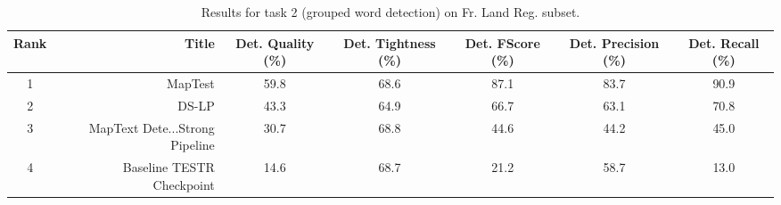 \begin{table}
\caption{Results for task 2 (grouped word detection) on Fr. Land Reg. subset.}
\begin{tabular}{crccccc}
\toprule
Rank & Title & Det. Quality (\%) & Det. Tightness (\%) & Det. FScore (\%) & Det. Precision (\%) & Det. Recall (\%) \\
\midrule
1 & MapTest & 59.8 & 68.6 & 87.1 & 83.7 & 90.9 \\
2 & DS-LP & 43.3 & 64.9 & 66.7 & 63.1 & 70.8 \\
3 & MapText Dete...Strong Pipeline & 30.7 & 68.8 & 44.6 & 44.2 & 45.0 \\
4 & Baseline TESTR Checkpoint & 14.6 & 68.7 & 21.2 & 58.7 & 13.0 \\
\bottomrule
\end{tabular}
\end{table}
